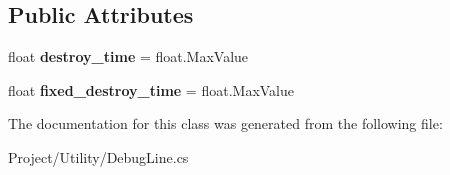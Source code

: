 \subsection*{Public Attributes}
\begin{DoxyCompactItemize}
\item 
\mbox{\label{class_debug_line_a8dd338f42279db7c3021db91b404d7d7}} 
float {\bfseries destroy\+\_\+time} = float.\+Max\+Value
\item 
\mbox{\label{class_debug_line_ad00e7c895184364d924545e9e48780a4}} 
float {\bfseries fixed\+\_\+destroy\+\_\+time} = float.\+Max\+Value
\end{DoxyCompactItemize}


The documentation for this class was generated from the following file\+:\begin{DoxyCompactItemize}
\item 
Project/\+Utility/Debug\+Line.\+cs\end{DoxyCompactItemize}
